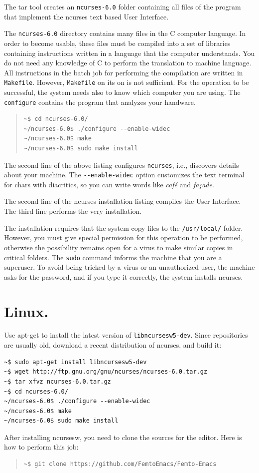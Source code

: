 \documentclass[a4paper,12pt]{book}
\begin{document}
The tar tool creates an \verb|ncurses-6.0| folder
containing all files of the program that implement
the ncurses text based User Interface.

The \verb|ncurses-6.0| directory contains
many files in the C  computer language.
In order to become usable, these files
must be compiled into a set of libraries
containing instructions written in a
language that the computer understands.
You do not need any knowledge of C to
perform the translation to machine
language. All instructions in the
batch job for performing the compilation
are written in  \verb|Makefile|. However,
\verb|Makefile| on its on is not
sufficient. For the operation to be
successful, the system needs also to know which
computer you are using. The \verb|configure|
contains the program that analyzes your
handware.
\begin{quote}
\begin{verbatim}
~$ cd ncurses-6.0/
~/ncurses-6.0$ ./configure --enable-widec
~/ncurses-6.0$ make
~/ncurses-6.0$ sudo make install
\end{verbatim}
\end{quote}
The second line of the above listing
configures \verb|ncurses|, i.e.,
discovers details about your machine.
The \verb|--enable-widec| option customizes
the text terminal for chars with
diacritics, so you can write words
like {\em café} and {\em façade}.

The second line of the ncurses installation
listing compiles the User Interface.
The third line performs the very installation.

The installation requires that the
system copy files to the \verb|/usr/local/|
folder. However, you must give special
permission for this operation to be performed,
otherwise the possibility remains open for
a virus to make similar copies
in critical folders.
The \verb|sudo|
command informs the machine that you
are a superuser. To avoid being tricked
by a virus or an unauthorized user,
the machine asks for the password,
and if you type it correctly,
the system installs ncurses.

\section{Linux.} Use apt-get to install the
latest version of \verb|libncursesw5-dev|.
Since repositories are usually old,
download a recent distribution of ncurses,
and build it:
\begin{verbatim}
~$ sudo apt-get install libncursesw5-dev
~$ wget http://ftp.gnu.org/gnu/ncurses/ncurses-6.0.tar.gz
~$ tar xfvz ncurses-6.0.tar.gz
~$ cd ncurses-6.0/
~/ncurses-6.0$ ./configure --enable-widec
~/ncurses-6.0$ make
~/ncurses-6.0$ sudo make install
\end{verbatim}
After installing ncursesw,  you need to
clone the sources for the editor. Here is how
to perform this job:
\begin{quote}
\begin{verbatim}
~$ git clone https://github.com/FemtoEmacs/Femto-Emacs
\end{verbatim}
\end{quote}
\end{document}
